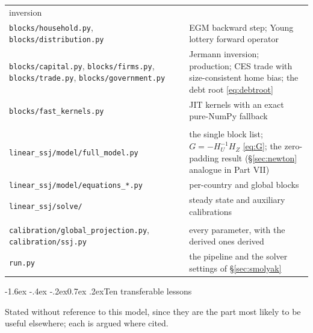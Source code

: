 \documentclass[10pt,a4paper]{article}
\makeatletter
\theoremstyle{definition}
\theoremstyle{plain}
\theoremstyle{remark}
\newcommand{\file}[1]{\textcolor{codeblue}{\texttt{#1}}}
\renewcommand\section{\@startsection{section}{1}{\z@}%
  {-1.6ex \@plus -.4ex \@minus -.2ex}{0.7ex \@plus.2ex}{\normalfont\large\bfseries}}
\makeatother
\begin{document}
\begin{center}
\begin{longtable}{@{}p{}p{}@{}}
inversion \\
\file{blocks/household.py}, \file{blocks/distribution.py} & EGM backward step; Young lottery
forward operator \\
\file{blocks/capital.py}, \file{blocks/firms.py}, \file{blocks/trade.py},
\file{blocks/government.py} & Jermann inversion; production; CES trade with size-consistent
home bias; the debt root \eqref{eq:debtroot} \\
\file{blocks/fast\_kernels.py} & JIT kernels with an exact pure-NumPy fallback \\
\addlinespace
\multicolumn{2}{@{}l}{\textbf{\emph{Sequence-space solver}}}\\
\file{linear\_ssj/model/full\_model.py} & the single block list; $G=-H_U^{-1}H_Z$
\eqref{eq:G}; the zero-padding result (\S\ref{sec:newton} analogue in Part VII) \\
\file{linear\_ssj/model/equations\_*.py} & per-country and global blocks \\
\file{linear\_ssj/solve/} & steady state and auxiliary calibrations \\
\addlinespace
\multicolumn{2}{@{}l}{\textbf{\emph{Shared}}}\\
\file{calibration/global\_projection.py}, \file{calibration/ssj.py} & every parameter, with
the derived ones derived \\
\file{run.py} & the pipeline and the solver settings of \S\ref{sec:smolyak} \\
\bottomrule
\end{longtable}
\end{center}

\section{Ten transferable lessons}

\noindent Stated without reference to this model, since they are the part most likely to be
useful elsewhere; each is argued where cited.
\end{document}

